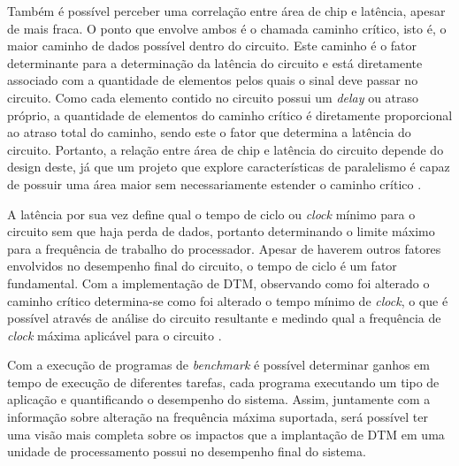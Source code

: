 Também é possível perceber uma correlação entre área de chip e latência, apesar de mais fraca. O ponto que envolve ambos é o chamada caminho crítico, isto é, o maior caminho de dados possível dentro do circuito. Este caminho é o fator determinante para a determinação da latência do circuito e está diretamente associado com a quantidade de elementos pelos quais o sinal deve passar no circuito. Como cada elemento contido no circuito possui um \textit{delay} ou atraso próprio, a quantidade de elementos do caminho crítico é diretamente proporcional ao atraso total do caminho, sendo este o fator que determina a latência do circuito. Portanto, a relação entre área de chip e latência do circuito depende do design deste, já que um projeto que explore características de paralelismo é capaz de possuir uma área maior sem necessariamente estender o caminho crítico \cite{patterson2013computer}.

A latência por sua vez define qual o tempo de ciclo ou \textit{clock} mínimo para o circuito sem que haja perda de dados, portanto determinando o limite máximo para a frequência de trabalho do processador. Apesar de haverem outros fatores envolvidos no desempenho final do circuito, o tempo de ciclo é um fator fundamental. Com a implementação de DTM, observando como foi alterado o caminho crítico determina-se como foi alterado o tempo mínimo de \textit{clock}, o que é possível através de análise do circuito resultante e medindo qual a frequência de \textit{clock} máxima aplicável para o circuito \cite{hennessy2011computer}.

Com a execução de programas de \textit{benchmark} é possível determinar ganhos em tempo de execução de diferentes tarefas, cada programa executando um tipo de aplicação e quantificando o desempenho do sistema. Assim, juntamente com a informação sobre alteração na frequência máxima suportada, será possível ter uma visão mais completa sobre os impactos que a implantação de DTM em uma unidade de processamento possui no desempenho final do sistema.